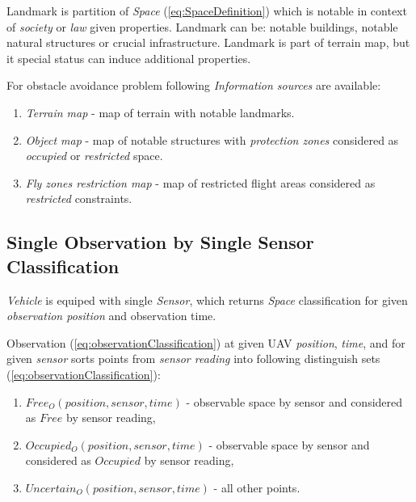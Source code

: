     \begin{definition}{Landmark}\label{def:Landmark} 
        is partition of \emph{Space} (\ref{eq:SpaceDefinition}) which is notable in context of \emph{society} or \emph{law} given properties. Landmark can be: notable buildings, notable natural structures or crucial infrastructure. Landmark is part of terrain map, but it special status can induce additional properties.
    \end{definition}

    \noindent For obstacle avoidance problem following \emph{Information sources} are available:
    
    \begin{enumerate}
        \item\emph{Terrain map} - map of terrain with notable landmarks.
        \item\emph{Object map} - map of notable structures with \emph{protection zones} considered as \emph{occupied} or \emph{restricted} space.
        \item\emph{Fly zones restriction map} - map of restricted flight areas considered as \emph{restricted} constraints.
    \end{enumerate}

\subsection{Single Observation by Single Sensor Classification} \label{singleObservationSingle sensor}
    \noindent\emph{Vehicle} is equiped with single \emph{Sensor}, which returns \emph{Space} classification for given \emph{observation position} and observation time.


    Observation (\ref{eq:observationClassification}) at given UAV \emph{position}, \emph{time}, and for given \emph{sensor} sorts points from \emph{sensor reading} into following distinguish sets (\ref{eq:observationClassification}):
    
    \begin{enumerate}
        \item $Free_O(position,sensor,time)$ - observable space by sensor and considered as $Free$ by sensor reading,
        \item $Occupied_O(position,sensor,time)$ -  observable space by sensor and considered as $Occupied$ by sensor reading,
        \item $Uncertain_O(position,sensor,time)$ - all other points.
    \end{enumerate}
    
